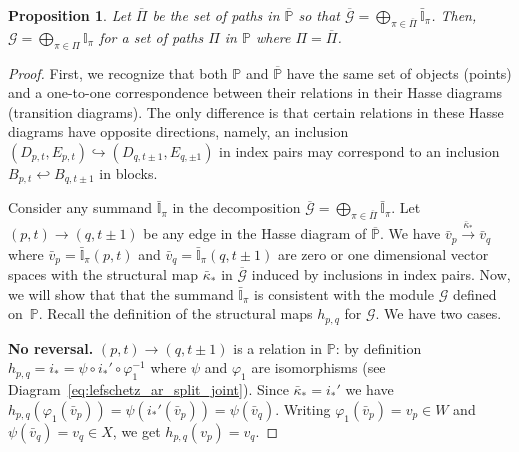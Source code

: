 \documentclass[letterpaper,11pt]{article}
\theoremstyle{plain}
\newtheorem{proposition}[theorem]{Proposition}
\theoremstyle{definition}
\renewcommand{\phi}{\varphi}
\newcounter{li}
\newcommand\michal[1]{\textcolor{ForestGreen}{[ML: #1]}}
\begin{document}
\begin{proposition}
    Let $\overline\Pi$ be the set of paths in $\overline{\mathbb{P}}$ so that %
    $\overline{\mathcal G}=\bigoplus_{\pi\in \overline{\Pi}} \bar{\mathbb{I}}_{\pi}$.
    Then, ${\mathcal G}=\bigoplus_{\pi\in \Pi} \mathbb{I}_{\pi}$
    for a set of paths $\Pi$ in $\mathbb{P}$ where $\Pi=\overline{\Pi}$.
    \label{prop:CMmodule-simplified}
\end{proposition}
\begin{proof}
    First, we recognize that both $\mathbb{P}$ and $\mathbb{\overline{P}}$ have the same 
    set of objects (points) and a one-to-one correspondence between their relations in their
    Hasse diagrams (transition diagrams). The only difference is that certain relations in these
    Hasse diagrams have opposite directions, namely, an inclusion $(D_{p,t},E_{p,t})\hookrightarrow (D_{q,t\pm 1},E_{q,\pm 1})$ in index pairs may correspond to an inclusion $B_{p,t}\hookleftarrow B_{q,t\pm 1}$ in blocks.

    Consider any summand $\bar{\mathbb{I}}_\pi$ in the decomposition $\overline{\mathcal G}=\bigoplus_{\pi\in \overline{\Pi}} \bar{\mathbb{I}}_{\pi}$. Let $(p,t)\rightarrow (q,t\pm 1)$ be
    any edge in the Hasse diagram of $\overline{\mathbb{P}}$. 
    We have $\bar v_p\stackrel{\bar\kappa_\ast}{\rightarrow}\bar v_q$
    where $\bar v_p=\bar{\mathbb{I}}_\pi(p,t)$ and $\bar v_q=\bar{\mathbb{I}}_\pi(q,t\pm 1)$ are zero or one dimensional vector spaces with the structural map $\bar\kappa_\ast$ in $\overline{\mathcal G}$
        induced by inclusions in index pairs. 
    Now, we will show that that the summand $\bar{\mathbb{I}}_\pi$ is consistent with the module $\mathcal G$ defined on~$\mathbb{P}$. 
    Recall the definition of the structural maps $h_{p,q}$ for $\mathcal G$. We have two cases.

    \textbf{No reversal.} $(p,t)\rightarrow (q,t\pm 1)$ is
    a relation in $\mathbb P$: by definition 
        $h_{p,q}= i_\ast=\psi\circ i_\ast'\circ\phi_1^{-1}$
    where $\psi$ and $\phi_1$ are isomorphisms (see Diagram~\ref{eq:lefschetz_ar_split_joint}).
    Since $\bar{\kappa}_\ast=i_\ast'$ we have $h_{p,q}(\phi_1(\bar v_p))=\psi(i_\ast'(\bar v_p))=\psi(\bar v_q)$.
    Writing
    $\phi_1(\bar v_p)=v_p\in W$ and $\psi(\bar v_q)=v_q\in  X$, we get $h_{p,q}(v_p)=v_q$.


\end{proof}
\end{document}
